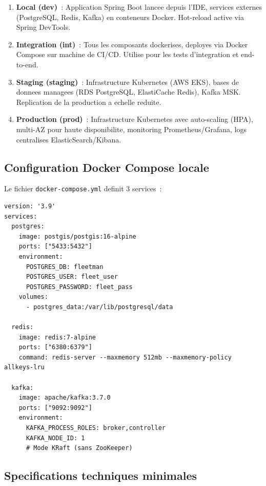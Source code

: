 \documentclass[12pt,a4paper]{report}
\begin{document}
\begin{enumerate}[leftmargin=2cm]
  \item \textbf{Local (dev)}~: Application Spring Boot lancee depuis l'IDE,
        services externes (PostgreSQL, Redis, Kafka) en conteneurs Docker.
        Hot-reload active via Spring DevTools.
        
  \item \textbf{Integration (int)}~: Tous les composants dockerises,
        deployes via Docker Compose sur machine de CI/CD. Utilise pour
        les tests d'integration et end-to-end.
        
  \item \textbf{Staging (staging)}~: Infrastructure Kubernetes (AWS EKS),
        bases de donnees managees (RDS PostgreSQL, ElastiCache Redis),
        Kafka MSK. Replication de la production a echelle reduite.
        
  \item \textbf{Production (prod)}~: Infrastructure Kubernetes avec
        auto-scaling (HPA), multi-AZ pour haute disponibilite, monitoring
        Prometheus/Grafana, logs centralises ElasticSearch/Kibana.
\end{enumerate}

\subsection{Configuration Docker Compose locale}

Le fichier \texttt{docker-compose.yml} definit 3 services~:

\begin{verbatim}
version: '3.9'
services:
  postgres:
    image: postgis/postgis:16-alpine
    ports: ["5433:5432"]
    environment:
      POSTGRES_DB: fleetman
      POSTGRES_USER: fleet_user
      POSTGRES_PASSWORD: fleet_pass
    volumes:
      - postgres_data:/var/lib/postgresql/data
      
  redis:
    image: redis:7-alpine
    ports: ["6380:6379"]
    command: redis-server --maxmemory 512mb --maxmemory-policy allkeys-lru
    
  kafka:
    image: apache/kafka:3.7.0
    ports: ["9092:9092"]
    environment:
      KAFKA_PROCESS_ROLES: broker,controller
      KAFKA_NODE_ID: 1
      # Mode KRaft (sans ZooKeeper)
\end{verbatim}

\subsection{Specifications techniques minimales}
\end{document}
